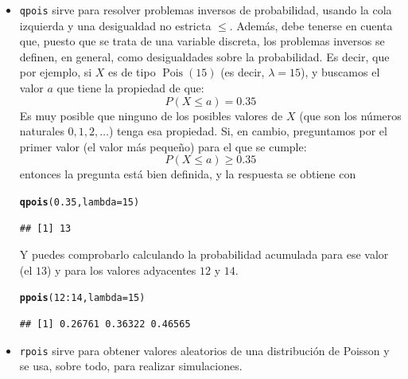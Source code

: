 \documentclass[10pt,a4paper]{article}\usepackage[]{graphicx}\usepackage[]{color}
\makeatletter
\newcommand{\hlnum}[1]{\textcolor[rgb]{0.686,0.059,0.569}{#1}}%
\newcommand{\hlopt}[1]{\textcolor[rgb]{0,0,0}{#1}}%
\newcommand{\hlstd}[1]{\textcolor[rgb]{0.345,0.345,0.345}{#1}}%
\newcommand{\hlkwc}[1]{\textcolor[rgb]{0.333,0.667,0.333}{#1}}%
\newcommand{\hlkwd}[1]{\textcolor[rgb]{0.737,0.353,0.396}{\textbf{#1}}}%
\newenvironment{kframe}{%
 \def\at@end@of@kframe{}%
 \ifinner\ifhmode%
  \def\at@end@of@kframe{\end{minipage}}%
  \begin{minipage}{\columnwidth}%
 \fi\fi%
 \def\FrameCommand##1{\hskip\@totalleftmargin \hskip-\fboxsep
 \colorbox{shadecolor}{##1}\hskip-\fboxsep
     \hskip-\linewidth \hskip-\@totalleftmargin \hskip\columnwidth}%
 \MakeFramed {\advance\hsize-\width
   \@totalleftmargin\z@ \linewidth\hsize
   \@setminipage}}%
 {\par\unskip\endMakeFramed%
 \at@end@of@kframe}
\newenvironment{knitrout}{}{} %
\makeatother
\begin{document}
\begin{itemize}
  \item {\tt qpois} sirve para resolver problemas inversos de probabilidad, usando la cola izquierda y una desigualdad no estricta $\leq$. Además, debe tenerse en cuenta que, puesto que se trata de una variable discreta, los problemas inversos se definen, en general, como desigualdades sobre la probabilidad. Es decir, que por ejemplo, si $X$ es de tipo
      $\operatorname{Pois}(15)$ (es decir, $\lambda=15$), y  buscamos el valor $a$ que tiene la
      propiedad de que:
      \[P(X\leq a)=0.35\]
      Es muy posible que ninguno de los posibles valores de $X$ (que son los números naturales
      $0, 1, 2,\ldots$) tenga esa propiedad. Si, en cambio, preguntamos por el primer valor (el valor más pequeño) para  el que se cumple:
      \[P(X\leq a)\geq 0.35\]
      entonces la pregunta está bien definida, y la respuesta se obtiene con
\begin{knitrout}
\color{fgcolor}\begin{kframe}
\begin{alltt}
\hlkwd{qpois}\hlstd{(}\hlnum{0.35}\hlstd{,} \hlkwc{lambda}\hlstd{=}\hlnum{15}\hlstd{)}
\end{alltt}
\begin{verbatim}
## [1] 13
\end{verbatim}
\end{kframe}
\end{knitrout}
      Y puedes comprobarlo calculando la probabilidad acumulada para ese valor (el $13$) y para los valores adyacentes $12$ y $14$.
\begin{knitrout}
\color{fgcolor}\begin{kframe}
\begin{alltt}
\hlkwd{ppois}\hlstd{(}\hlnum{12}\hlopt{:}\hlnum{14}\hlstd{,} \hlkwc{lambda}\hlstd{=}\hlnum{15}\hlstd{)}
\end{alltt}
\begin{verbatim}
## [1] 0.26761 0.36322 0.46565
\end{verbatim}
\end{kframe}
\end{knitrout}

  \item {\tt rpois} sirve para obtener valores aleatorios de una distribución de Poisson y se usa, sobre todo, para realizar simulaciones.

\end{itemize}
\end{document}

